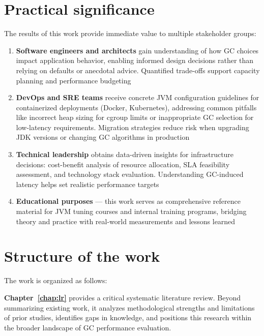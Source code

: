 \section{Practical significance}
\label{sec:significance}

The results of this work provide immediate value to multiple stakeholder groups:

\begin{enumerate}
    \item \textbf{Software engineers and architects} gain understanding of how GC choices impact application behavior, enabling informed design decisions rather than relying on defaults or anecdotal advice. Quantified trade-offs support capacity planning and performance budgeting
    
    \item \textbf{DevOps and SRE teams} receive concrete JVM configuration guidelines for containerized deployments (Docker, Kubernetes), addressing common pitfalls like incorrect heap sizing for cgroup limits or inappropriate GC selection for low-latency requirements. Migration strategies reduce risk when upgrading JDK versions or changing GC algorithms in production
    
    \item \textbf{Technical leadership} obtains data-driven insights for infrastructure decisions: cost-benefit analysis of resource allocation, SLA feasibility assessment, and technology stack evaluation. Understanding GC-induced latency helps set realistic performance targets
    
    \item \textbf{Educational purposes} --- this work serves as comprehensive reference material for JVM tuning courses and internal training programs, bridging theory and practice with real-world measurements and lessons learned
\end{enumerate}

\section{Structure of the work}
\label{sec:structure}

The work is organized as follows:

\textbf{Chapter~\ref{chap:lr}} provides a critical systematic literature review. Beyond summarizing existing work, it analyzes methodological strengths and limitations of prior studies, identifies gaps in knowledge, and positions this research within the broader landscape of GC performance evaluation.

